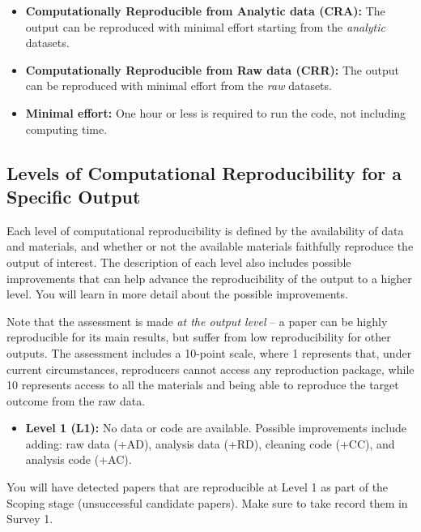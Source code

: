 \documentclass[]{book}
\providecommand{\tightlist}{%
  \setlength{\itemsep}{0pt}\setlength{\parskip}{0pt}}
\begin{document}
\begin{itemize}
\item
  \textbf{Computationally Reproducible from Analytic data (CRA):} The output can be reproduced with minimal effort starting from the \emph{analytic} datasets.
\item
  \textbf{Computationally Reproducible from Raw data (CRR):} The output can be reproduced with minimal effort from the \emph{raw} datasets.
\item
  \textbf{Minimal effort:} One hour or less is required to run the code, not including computing time.
\end{itemize}

\hypertarget{levels-of-computational-reproducibility-for-a-specific-output}{%
\subsection{Levels of Computational Reproducibility for a Specific Output}\label{levels-of-computational-reproducibility-for-a-specific-output}}

Each level of computational reproducibility is defined by the availability of data and materials, and whether or not the available materials faithfully reproduce the output of interest. The description of each level also includes possible improvements that can help advance the reproducibility of the output to a higher level. You will learn in more detail about the possible improvements.

Note that the assessment is made \emph{at the output level} -- a paper can be highly reproducible for its main results, but suffer from low reproducibility for other outputs. The assessment includes a 10-point scale, where 1 represents that, under current circumstances, reproducers cannot access any reproduction package, while 10 represents access to all the materials and being able to reproduce the target outcome from the raw data.

\begin{itemize}
\tightlist
\item
  \textbf{Level 1 (L1):} No data or code are available. Possible improvements include adding: raw data (+AD), analysis data (+RD), cleaning code (+CC), and analysis code (+AC).
\end{itemize}

You will have detected papers that are reproducible at Level 1 as part of the Scoping stage (unsuccessful candidate papers). Make sure to take record them in Survey 1.
\end{document}
